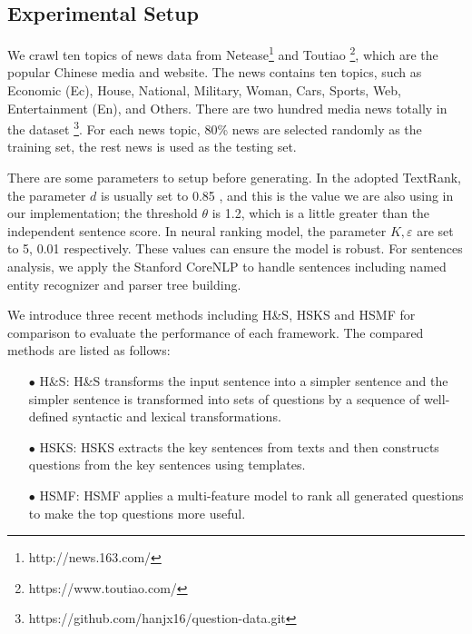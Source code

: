 \documentclass[runningheads,UTF8,article]{comsis2}
\newcommand\revised[1]{{\color{black} #1}}
\begin{document}
	\subsection{Experimental Setup}
	We crawl ten topics of news data from Netease\footnote{http://news.163.com/} and Toutiao \footnote{https://www.toutiao.com/}, which are the popular Chinese media and website. The news contains ten topics, such as Economic (Ec), House, National, Military, Woman, Cars, Sports, Web, Entertainment (En), and Others. \revised{There are two hundred media news totally in the dataset \footnote{https://github.com/hanjx16/question-data.git}.} For each news topic, 80\% news are selected randomly as the training set, the rest news is used as the testing set.
	
	There are some parameters to setup before generating. In the adopted TextRank, the parameter $ d $ is usually set to 0.85 \cite{textrank}, and this is the value we are also using in our implementation; the threshold $ \theta $ is 1.2, which is a little greater than the independent sentence score. 
	In neural ranking model, the parameter $ K,\varepsilon$ are set to 5, 0.01 \cite{neural} respectively. These values can ensure the model is robust.
	For sentences analysis, we apply the Stanford CoreNLP \cite{stanford} to handle sentences including named entity recognizer and parser tree building. 
	
	\revised{
	We introduce three recent methods including H\&S, HSKS and HSMF for comparison to evaluate the performance of each framework. The compared methods are listed as follows:
	\begin{itemize}
		\item[$\bullet$]{H\&S: H\&S transforms the input sentence into a simpler sentence and the simpler sentence is transformed into sets of questions by a sequence of well-defined syntactic and lexical transformations.\cite{heilman2010good}} 
		\item[$\bullet$]{HSKS: HSKS extracts  the key sentences from texts and then constructs questions from the key sentences using templates.}
		\item[$\bullet$]{HSMF: HSMF applies a multi-feature model to rank all generated questions to make the top questions more useful.}
	\end{itemize}
}
	
\end{document}
